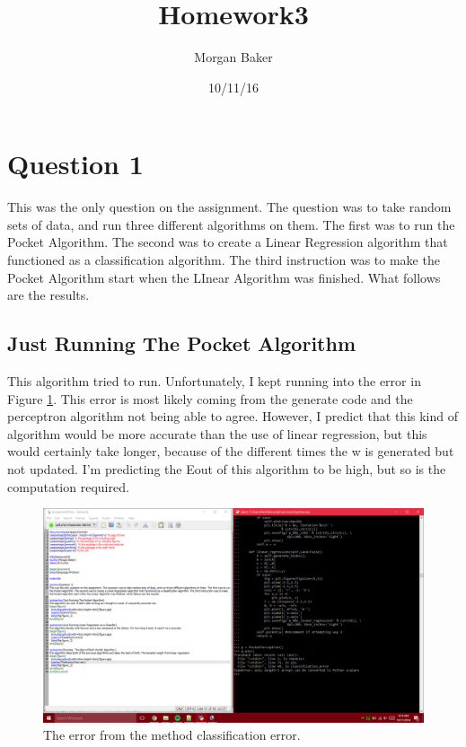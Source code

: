 \documentclass[a4paper]{article}
\title{Homework3}
\author{Morgan Baker}
\date{10/11/16}
\begin{document}
\lstset{language=Python}

\maketitle

\section{Question 1}
This was the only question on the assignment. The question was to take random sets of data, and run three different algorithms on them. The first was to run the Pocket Algorithm. The second was to create a Linear Regression algorithm that functioned as a classification algorithm. The third instruction was to make the Pocket Algorithm start when the LInear Algorithm was finished. What follows are the results.

\subsection{Just Running The Pocket Algorithm}
This algorithm tried to run. Unfortunately, I kept running into the error in Figure \ref{fig:Figure1}. This error is most likely coming from the generate code and the perceptron algorithm not being able to agree. However, I predict that this kind of algorithm would be more accurate than the use of linear regression, but this would certainly take longer, because of the different times the w is generated but not updated. I'm predicting the Eout of this algorithm to be high, but so is the computation required.
\begin{figure}
  \includegraphics[width=\linewidth]{broken.png}
  \caption{The error from the method classification error.}
  \label{fig:Figure1}
\end{figure}
\end{document}
